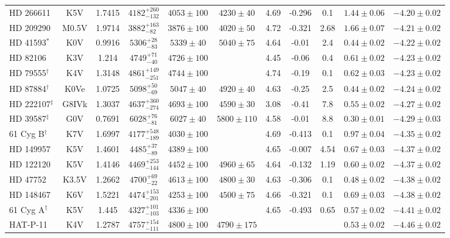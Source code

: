 \begin{tiny}
\begin{longtable}{l|c|c|ccc|ccc|cc}
HD 266611 & K5V & 1.7415 & $4182^{+260}_{-132}$ & $4053 \pm 100$ & $4230 \pm 40$ & 4.69 & -0.296 & 0.1 & $1.44 \pm 0.06$ & $-4.20 \pm 0.02$ \\
HD 209290 & M0.5V & 1.9714 & $3882^{+163}_{-82}$ & $3876 \pm 100$ & $4020 \pm 50$ & 4.72 & -0.321 & 2.68 & $1.66 \pm 0.07$ & $-4.21 \pm 0.02$ \\
HD 41593$^*$ & K0V & 0.9916 & $5306^{+28}_{-83}$ & $5339 \pm 40$ & $5040 \pm 75$ & 4.64 & -0.01 & 2.4 & $0.44 \pm 0.02$ & $-4.22 \pm 0.02$ \\
HD 82106 & K3V & 1.214 & $4749^{+71}_{-40}$ & $4726 \pm 100$ &  & 4.45 & -0.06 & 0.4 & $0.61 \pm 0.02$ & $-4.23 \pm 0.02$ \\
HD 79555$^\dagger$ & K4V & 1.3148 & $4861^{+149}_{-251}$ & $4744 \pm 100$ &  & 4.74 & -0.19 & 0.1 & $0.62 \pm 0.03$ & $-4.23 \pm 0.02$ \\
HD 87884$^\dagger$ & K0Ve & 1.0725 & $5098^{+50}_{-69}$ & $5047 \pm 40$ & $4920 \pm 40$ & 4.63 & -0.25 & 2.5 & $0.44 \pm 0.02$ & $-4.24 \pm 0.02$ \\
HD 222107$^\ddagger$ & G8IVk & 1.3037 & $4637^{+360}_{-274}$ & $4693 \pm 100$ & $4590 \pm 30$ & 3.08 & -0.41 & 7.8 & $0.55 \pm 0.02$ & $-4.27 \pm 0.02$ \\
HD 39587$^\ddagger$ & G0V & 0.7691 & $6028^{+76}_{-81}$ & $6027 \pm 40$ & $5800 \pm 110$ & 4.58 & -0.01 & 8.8 & $0.30 \pm 0.01$ & $-4.29 \pm 0.03$ \\
61 Cyg B$^\dagger$ & K7V & 1.6997 & $4177^{+548}_{-189}$ & $4030 \pm 100$ &  & 4.69 & -0.413 & 0.1 & $0.97 \pm 0.04$ & $-4.35 \pm 0.02$ \\
HD 149957 & K5V & 1.4601 & $4485^{+37}_{-89}$ & $4389 \pm 100$ &  & 4.65 & -0.007 & 4.54 & $0.67 \pm 0.03$ & $-4.37 \pm 0.02$ \\
HD 122120 & K5V & 1.4146 & $4469^{+253}_{-144}$ & $4452 \pm 100$ & $4960 \pm 65$ & 4.64 & -0.132 & 1.19 & $0.60 \pm 0.02$ & $-4.37 \pm 0.02$  \\
HD 47752 & K3.5V & 1.2662 & $4700^{+69}_{-22}$ & $4613 \pm 100$ & $4800 \pm 30$ & 4.63 & -0.306 & 0.1 & $0.48 \pm 0.02$ & $-4.38 \pm 0.02$ \\
HD 148467 & K6V & 1.5221 & $4474^{+153}_{-201}$ & $4253 \pm 100$ & $4500 \pm 75$ & 4.66 & -0.321 & 0.1 & $0.69 \pm 0.03$ & $-4.38 \pm 0.02$ \\
61 Cyg A$^\dagger$ & K5V & 1.445 & $4327^{+101}_{-103}$ & $4336 \pm 100$ &  & 4.65 & -0.493 & 0.65 & $0.57 \pm 0.02$ & $-4.41 \pm 0.02$ \\
HAT-P-11 & K4V & 1.2787 & $4757^{+154}_{-111}$ & $4800 \pm 100$ & $4790 \pm 175$ &  &  &  & $0.53 \pm 0.02$ & $-4.46 \pm 0.02$ \\

\end{longtable}
\end{tiny}
